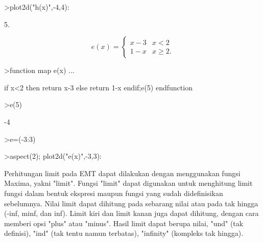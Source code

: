 \documentclass[a4paper,10pt]{article}
\begin{document}
\begin{eulernotebook}
\begin{eulercomment}
\begin{eulercomment}
\begin{eulercomment}
\begin{eulercomment}
\begin{eulercomment}
\begin{eulercomment}
\begin{eulercomment}
\begin{eulercomment}
\begin{eulercomment}
\begin{eulercomment}
\begin{eulercomment}
\begin{eulercomment}
\begin{eulercomment}
\begin{eulercomment}
\begin{eulercomment}
\begin{eulercomment}
\begin{eulercomment}
\begin{eulercomment}
\begin{euleroutput}
\end{euleroutput}
\begin{eulerprompt}
>plot2d("h(x)",-4,4):
\end{eulerprompt}
\begin{eulercomment}
5.\\
\end{eulercomment}
\begin{eulerformula}
\[
e(x) = \begin{cases} x-3 & x<2 \\ 1-x & x\ge2. \end{cases}
\]
\end{eulerformula}
\begin{eulerprompt}
>function map e(x) ...
\end{eulerprompt}
\begin{eulerudf}
  if x<2 then return x-3
  else return 1-x
  endif;e(5)
  endfunction
\end{eulerudf}
\begin{eulerprompt}
>e(5)
\end{eulerprompt}
\begin{euleroutput}
  -4
\end{euleroutput}
\begin{eulerprompt}
>e=(-3:3)
\end{eulerprompt}
\begin{euleroutput}
  [-3,  -2,  -1,  0,  1,  2,  3]
\end{euleroutput}
\begin{eulerprompt}
>aspect(2); plot2d("e(x)",-3,3):
\end{eulerprompt}
\begin{eulercomment}
\begin{eulercomment}
\begin{eulercomment}
Perhitungan limit pada EMT dapat dilakukan dengan menggunakan fungsi
Maxima, yakni "limit". Fungsi "limit" dapat digunakan untuk menghitung
limit fungsi dalam bentuk ekspresi maupun fungsi yang sudah
didefinisikan sebelumnya. Nilai limit dapat dihitung pada sebarang
nilai atau pada tak hingga (-inf, minf, dan inf). Limit kiri dan limit
kanan juga dapat dihitung, dengan cara memberi opsi "plus" atau
"minus". Hasil limit dapat berupa nilai, "und" (tak definisi), "ind"
(tak tentu namun terbatas), "infinity" (kompleks tak hingga).


\end{eulercomment}
\end{eulercomment}
\end{eulercomment}
\end{eulercomment}
\end{eulercomment}
\end{eulercomment}
\end{eulercomment}
\end{eulercomment}
\end{eulercomment}
\end{eulercomment}
\end{eulercomment}
\end{eulercomment}
\end{eulercomment}
\end{eulercomment}
\end{eulercomment}
\end{eulercomment}
\end{eulercomment}
\end{eulercomment}
\end{eulercomment}
\end{eulercomment}
\end{eulercomment}
\end{eulernotebook}
\end{document}
